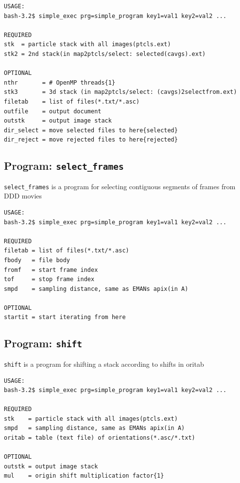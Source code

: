 \documentclass[a4paper,11pt]{article}
\newcommand{\prgname}[1]{\textcolor{NavyBlue}{\texttt{#1}}}
\begin{document}
\begin{verbatim}
USAGE:
bash-3.2$ simple_exec prg=simple_program key1=val1 key2=val2 ...

REQUIRED
stk  = particle stack with all images(ptcls.ext)
stk2 = 2nd stack(in map2ptcls/select: selected(cavgs).ext)

OPTIONAL
nthr       = # OpenMP threads{1}
stk3       = 3d stack (in map2ptcls/select: (cavgs)2selectfrom.ext)
filetab    = list of files(*.txt/*.asc)
outfile    = output document
outstk     = output image stack
dir_select = move selected files to here{selected}
dir_reject = move rejected files to here{rejected}
\end{verbatim}

\subsection{Program: \prgname{select\_frames}}
\label{select_frames}
\prgname{select\_frames} is a program for selecting contiguous segments of frames from DDD movies 

\begin{verbatim}
USAGE:
bash-3.2$ simple_exec prg=simple_program key1=val1 key2=val2 ...

REQUIRED
filetab = list of files(*.txt/*.asc)
fbody   = file body
fromf   = start frame index
tof     = stop frame index
smpd    = sampling distance, same as EMANs apix(in A)

OPTIONAL
startit = start iterating from here
\end{verbatim}

\subsection{Program: \prgname{shift}}
\label{shift}
\prgname{shift} is a program for shifting a stack according to shifts in oritab

\begin{verbatim}
USAGE:
bash-3.2$ simple_exec prg=simple_program key1=val1 key2=val2 ...

REQUIRED
stk    = particle stack with all images(ptcls.ext)
smpd   = sampling distance, same as EMANs apix(in A)
oritab = table (text file) of orientations(*.asc/*.txt)

OPTIONAL
outstk = output image stack
mul    = origin shift multiplication factor{1}
\end{verbatim}
\end{document}
